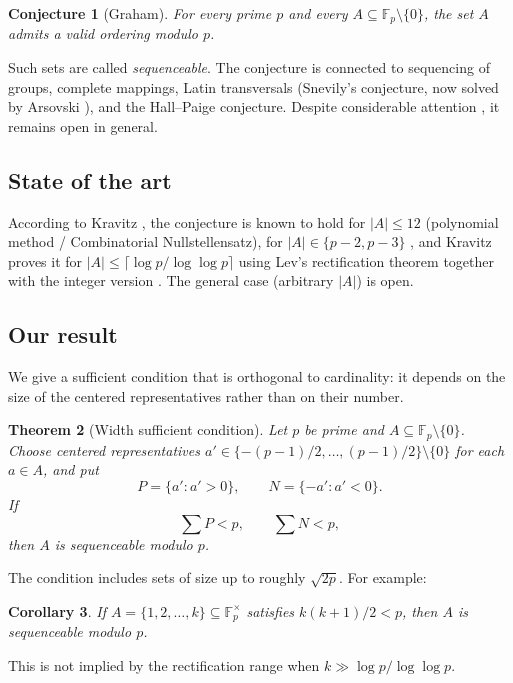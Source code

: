 \documentclass[11pt]{article}
\newtheorem{theorem}{Theorem}
\newtheorem{corollary}[theorem]{Corollary}
\newtheorem{conjecture}[theorem]{Conjecture}
\theoremstyle{definition}
\begin{document}
\begin{conjecture}[Graham]
For every prime $p$ and every $A\subseteq\mathbb F_p\setminus\{0\}$, the set
$A$ admits a valid ordering modulo $p$.
\end{conjecture}

Such sets are called \emph{sequenceable}. The conjecture is connected to
sequencing of groups, complete mappings, Latin transversals (Snevily's
conjecture, now solved by Arsovski \cite{arsovski2011}), and the Hall--Paige
conjecture. Despite considerable attention \cite{costa2020, costa2022,
hicks2019}, it remains open in general.

\subsection{State of the art}
According to Kravitz \cite{kravitz2024}, the conjecture is known to hold for
$|A|\le 12$ (polynomial method / Combinatorial Nullstellensatz), for
$|A|\in\{p-2,p-3\}$ \cite{hicks2019}, and Kravitz proves it for
$|A|\le\lceil\log p/\log\log p\rceil$ using Lev's rectification theorem
\cite{lev2008} together with the integer version
\cite{kravitz2024,sawin2015}. The general case (arbitrary $|A|$) is open.

\subsection{Our result}
We give a sufficient condition that is orthogonal to cardinality: it depends
on the size of the centered representatives rather than on their number.

\begin{theorem}[Width sufficient condition]\label{thm:main}
Let $p$ be prime and $A\subseteq\mathbb F_p\setminus\{0\}$. Choose centered
representatives $a'\in\{-(p-1)/2,\dots,(p-1)/2\}\setminus\{0\}$ for each
$a\in A$, and put
\[
  P=\{a':a'>0\},\qquad N=\{-a':a'<0\}.
\]
If
\[
  \sum P < p,\qquad \sum N < p,
\]
then $A$ is sequenceable modulo $p$.
\end{theorem}

The condition includes sets of size up to roughly $\sqrt{2p}$. For example:

\begin{corollary}\label{cor:consecutive}
If $A=\{1,2,\dots,k\}\subseteq\mathbb F_p^\times$ satisfies
$k(k+1)/2<p$, then $A$ is sequenceable modulo $p$.
\end{corollary}

This is not implied by the rectification range when $k\gg\log p/\log\log p$.
\end{document}
